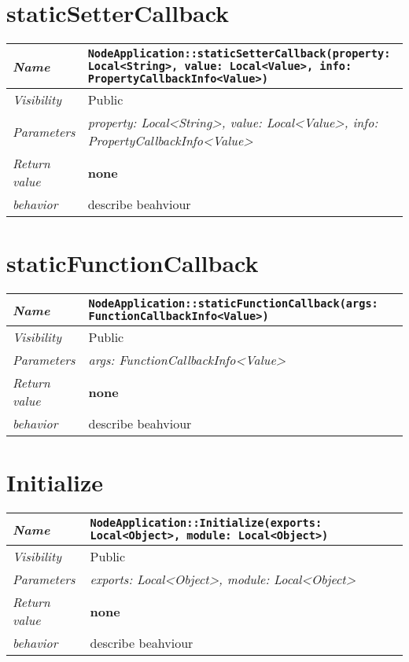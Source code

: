  \section{staticSetterCallback}
\begin{longtable}{p{3cm} @{\hskip 1cm} p{12cm}}
 \hline
\textit{Name} & \texttt{NodeApplication::staticSetterCallback(property: Local<String>, value: Local<Value>, info: PropertyCallbackInfo<Value>)}\\
\hline
 \textit{Visibility} & Public \\
\hline
\textit{Parameters} & \textit{property: Local<String>, value: Local<Value>, info: PropertyCallbackInfo<Value>}\\
\hline
\textit{Return value} & \textbf{none}\\
  \hline
 \textit{behavior} & describe beahviour \\
\hline
\end{longtable} \pagebreak
 \section{staticFunctionCallback}
\begin{longtable}{p{3cm} @{\hskip 1cm} p{12cm}}
 \hline
\textit{Name} & \texttt{NodeApplication::staticFunctionCallback(args: FunctionCallbackInfo<Value>)}\\
\hline
 \textit{Visibility} & Public \\
\hline
\textit{Parameters} & \textit{args: FunctionCallbackInfo<Value>}\\
\hline
\textit{Return value} & \textbf{none}\\
  \hline
 \textit{behavior} & describe beahviour \\
\hline
\end{longtable} \pagebreak
 \section{Initialize}
\begin{longtable}{p{3cm} @{\hskip 1cm} p{12cm}}
 \hline
\textit{Name} & \texttt{NodeApplication::Initialize(exports: Local<Object>, module: Local<Object>)}\\
\hline
 \textit{Visibility} & Public \\
\hline
\textit{Parameters} & \textit{exports: Local<Object>, module: Local<Object>}\\
\hline
\textit{Return value} & \textbf{none}\\
  \hline
 \textit{behavior} & describe beahviour \\
\hline
\end{longtable} \pagebreak
